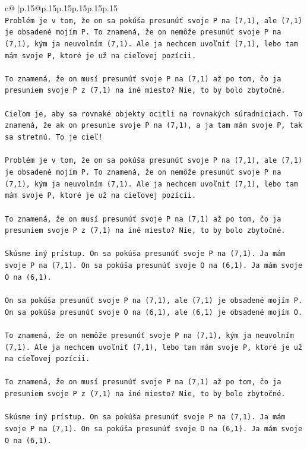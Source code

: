 \documentclass{article}
\begin{document}
{\begin{supertabular}{c@{$\;$}|p{.15\linewidth}@{}p{.15\linewidth}p{.15\linewidth}p{.15\linewidth}p{.15\linewidth}p{.15\linewidth}}
{{{\\ 
\texttt{Problém je v tom, že on sa pokúša presunúť svoje P na (7,1), ale (7,1) je obsadené mojím P. To znamená, že on nemôže presunúť svoje P na (7,1), kým ja neuvolním (7,1). Ale ja nechcem uvoľniť (7,1), lebo tam mám svoje P, ktoré je už na cieľovej pozícii.} \\
\\ 
\texttt{To znamená, že on musí presunúť svoje P na (7,1) až po tom, čo ja presuniem svoje P z (7,1) na iné miesto? Nie, to by bolo zbytočné.} \\
\\ 
\texttt{Cieľom je, aby sa rovnaké objekty ocitli na rovnakých súradniciach. To znamená, že ak on presunie svoje P na (7,1), a ja tam mám svoje P, tak sa stretnú. To je cieľ!} \\
\\ 
\texttt{Problém je v tom, že on sa pokúša presunúť svoje P na (7,1), ale (7,1) je obsadené mojím P. To znamená, že on nemôže presunúť svoje P na (7,1), kým ja neuvolním (7,1). Ale ja nechcem uvoľniť (7,1), lebo tam mám svoje P, ktoré je už na cieľovej pozícii.} \\
\\ 
\texttt{To znamená, že on musí presunúť svoje P na (7,1) až po tom, čo ja presuniem svoje P z (7,1) na iné miesto? Nie, to by bolo zbytočné.} \\
\\ 
\texttt{Skúsme iný prístup. On sa pokúša presunúť svoje P na (7,1). Ja mám svoje P na (7,1). On sa pokúša presunúť svoje O na (6,1). Ja mám svoje O na (6,1).} \\
\\ 
\texttt{On sa pokúša presunúť svoje P na (7,1), ale (7,1) je obsadené mojím P. On sa pokúša presunúť svoje O na (6,1), ale (6,1) je obsadené mojím O.} \\
\\ 
\texttt{To znamená, že on nemôže presunúť svoje P na (7,1), kým ja neuvolním (7,1). Ale ja nechcem uvoľniť (7,1), lebo tam mám svoje P, ktoré je už na cieľovej pozícii.} \\
\\ 
\texttt{To znamená, že on musí presunúť svoje P na (7,1) až po tom, čo ja presuniem svoje P z (7,1) na iné miesto? Nie, to by bolo zbytočné.} \\
\\ 
\texttt{Skúsme iný prístup. On sa pokúša presunúť svoje P na (7,1). Ja mám svoje P na (7,1). On sa pokúša presunúť svoje O na (6,1). Ja mám svoje O na (6,1).} \\
}}}
\end{supertabular}}
\end{document}
